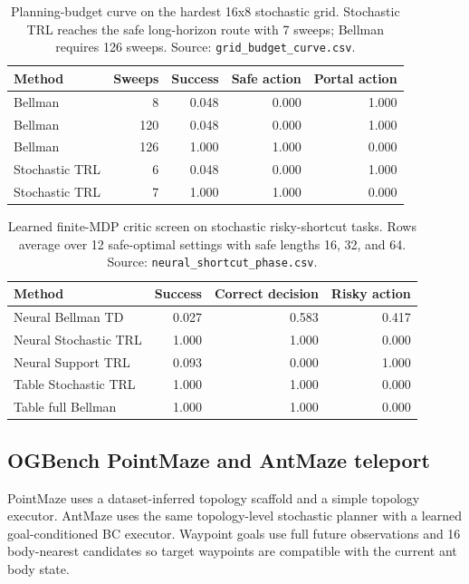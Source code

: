 \documentclass[10pt]{article}
\begin{document}
\begin{table}[t]
\centering
\caption{Planning-budget curve on the hardest 16x8 stochastic grid. Stochastic
TRL reaches the safe long-horizon route with 7 sweeps; Bellman requires 126
sweeps. Source: \texttt{grid\_budget\_curve.csv}.}
\label{tab:grid-budget}
\begin{tabular}{lrrrr}
\toprule
Method & Sweeps & Success & Safe action & Portal action\\
\midrule
Bellman & 8 & 0.048 & 0.000 & 1.000\\
Bellman & 120 & 0.048 & 0.000 & 1.000\\
Bellman & 126 & 1.000 & 1.000 & 0.000\\
Stochastic TRL & 6 & 0.048 & 0.000 & 1.000\\
Stochastic TRL & 7 & 1.000 & 1.000 & 0.000\\
\bottomrule
\end{tabular}
\end{table}

\begin{table}[t]
\centering
\caption{Learned finite-MDP critic screen on stochastic risky-shortcut tasks.
Rows average over 12 safe-optimal settings with safe lengths 16, 32, and 64.
Source: \texttt{neural\_shortcut\_phase.csv}.}
\label{tab:neural-shortcut}
\begin{tabular}{lrrr}
\toprule
Method & Success & Correct decision & Risky action\\
\midrule
Neural Bellman TD & 0.027 & 0.583 & 0.417\\
Neural Stochastic TRL & 1.000 & 1.000 & 0.000\\
Neural Support TRL & 0.093 & 0.000 & 1.000\\
Table Stochastic TRL & 1.000 & 1.000 & 0.000\\
Table full Bellman & 1.000 & 1.000 & 0.000\\
\bottomrule
\end{tabular}
\end{table}

\subsection{OGBench PointMaze and AntMaze teleport}

PointMaze uses a dataset-inferred topology scaffold and a simple topology
executor. AntMaze uses the same topology-level stochastic planner with a
learned goal-conditioned BC executor. Waypoint goals use full future
observations and 16 body-nearest candidates so target waypoints are compatible
with the current ant body state.
\end{document}
